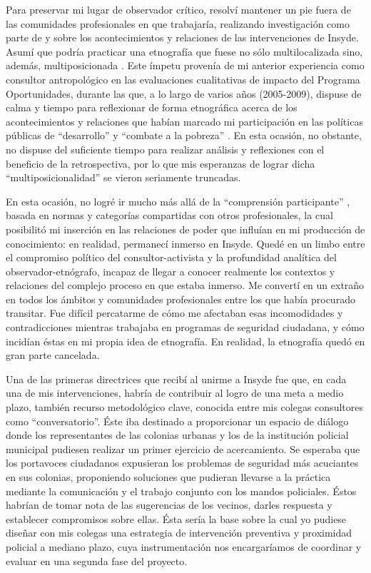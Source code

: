 \documentclass[
  spanish,
  11pt,
  a4paper,
]{scrbook}
\begin{document}
Para preservar mi lugar de observador crítico, resolví mantener un pie
fuera de las comunidades profesionales en que trabajaría, realizando
investigación como parte de y sobre los acontecimientos y relaciones de
las intervenciones de Insyde. Asumí que podría practicar una etnografía
que fuese no sólo multilocalizada sino, además, multiposicionada
\autocite[11]{Mosse2005}. Este ímpetu provenía de mi anterior
experiencia como consultor antropológico en las evaluaciones
cualitativas de impacto del Programa Oportunidades, durante las que, a
lo largo de varios años (2005-2009), dispuse de calma y tiempo para
reflexionar de forma etnográfica acerca de los acontecimientos y
relaciones que habían marcado mi participación en las políticas públicas
de ``desarrollo'' y ``combate a la pobreza''
\autocite{AgudoSanchiz2015}. En esta ocasión, no obstante, no dispuse
del suficiente tiempo para realizar análisis y reflexiones con el
beneficio de la retrospectiva, por lo que mis esperanzas de lograr dicha
``multiposicionalidad'' se vieron seriamente truncadas.

En esta ocasión, no logré ir mucho más allá de la ``comprensión
participante'' \autocite[Mikkelsen,1995, como se cita en][55]{Wood1998},
basada en normas y categorías compartidas con otros profesionales, la
cual posibilitó mi inserción en las relaciones de poder que influían en
mi producción de conocimiento: en realidad, permanecí inmerso en Insyde.
Quedé en un limbo entre el compromiso político del consultor-activista y
la profundidad analítica del observador-etnógrafo, incapaz de llegar a
conocer realmente los contextos y relaciones del complejo proceso en que
estaba inmerso. Me convertí en un extraño en todos los ámbitos y
comunidades profesionales entre los que había procurado transitar. Fue
difícil percatarme de cómo me afectaban esas incomodidades y
contradicciones mientras trabajaba en programas de seguridad ciudadana,
y cómo incidían éstas en mi propia idea de etnografía. En realidad, la
etnografía quedó en gran parte cancelada.

Una de las primeras directrices que recibí al unirme a Insyde fue que,
en cada una de mis intervenciones, habría de contribuir al logro de una
meta a medio plazo, también recurso metodológico clave, conocida entre
mis colegas consultores como ``conversatorio''. Éste iba destinado a
proporcionar un espacio de diálogo donde los representantes de las
colonias urbanas y los de la institución policial municipal pudiesen
realizar un primer ejercicio de acercamiento. Se esperaba que los
portavoces ciudadanos expusieran los problemas de seguridad más
acuciantes en sus colonias, proponiendo soluciones que pudieran llevarse
a la práctica mediante la comunicación y el trabajo conjunto con los
mandos policiales. Éstos habrían de tomar nota de las sugerencias de los
vecinos, darles respuesta y establecer compromisos sobre ellas. Ésta
sería la base sobre la cual yo pudiese diseñar con mis colegas una
estrategia de intervención preventiva y proximidad policial a mediano
plazo, cuya instrumentación nos encargaríamos de coordinar y evaluar en
una segunda fase del proyecto.
\end{document}
